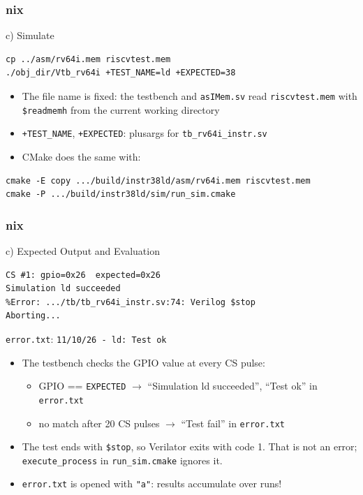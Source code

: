 \documentclass{beamer}
\newcommand{\astitle}{nix}
\newcommand{\assubtitle}{nix}
\newcommand{\cmd}[1]{\texttt{#1}}
\begin{document}
\renewcommand{\assubtitle}{c) Simulate}
\begin{frame}[fragile]
\frametitle{\astitle}
\begin{block}{\assubtitle}
\begin{lstlisting}[style=sh]
cp ../asm/rv64i.mem riscvtest.mem
./obj_dir/Vtb_rv64i +TEST_NAME=ld +EXPECTED=38
\end{lstlisting}
  \begin{itemize}
    \item The file name is fixed: the testbench and \cmd{asIMem.sv} read
      \cmd{riscvtest.mem} with \cmd{\$readmemh} from the current working directory
    \item \cmd{+TEST\_NAME}, \cmd{+EXPECTED}: plusargs for \cmd{tb\_rv64i\_instr.sv}
    \item CMake does the same with:
  \end{itemize}
\begin{lstlisting}[style=sh]
cmake -E copy .../build/instr38ld/asm/rv64i.mem riscvtest.mem
cmake -P .../build/instr38ld/sim/run_sim.cmake
\end{lstlisting}
\end{block}
\end{frame}

\renewcommand{\assubtitle}{c) Expected Output and Evaluation}
\begin{frame}[fragile]
\frametitle{\astitle}
\begin{block}{\assubtitle}
\begin{lstlisting}
CS #1: gpio=0x26  expected=0x26
Simulation ld succeeded
%Error: .../tb/tb_rv64i_instr.sv:74: Verilog $stop
Aborting...
\end{lstlisting}
  \cmd{error.txt}: \cmd{11/10/26 - ld: Test ok}
  \footnotesize
  \begin{itemize}
    \item The testbench checks the GPIO value at every CS pulse:
    \begin{itemize}
      \item GPIO == \cmd{EXPECTED} $\rightarrow$ ``Simulation ld succeeded'',
        ``Test ok'' in \cmd{error.txt}
      \item no match after 20 CS pulses $\rightarrow$ ``Test fail'' in \cmd{error.txt}
    \end{itemize}
    \item The test ends with \cmd{\$stop}, so Verilator exits with code 1.
      That is not an error; \cmd{execute\_process} in \cmd{run\_sim.cmake} ignores it.
    \item \cmd{error.txt} is opened with \cmd{"a"}: results accumulate over runs!
  \end{itemize}
\end{block}
\end{frame}
\end{document}
